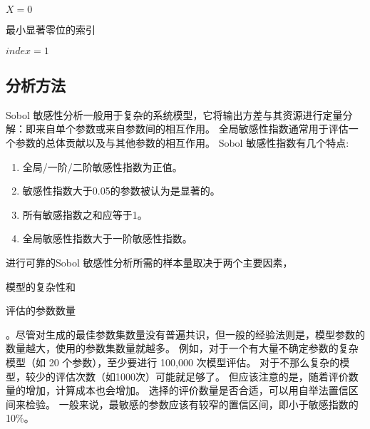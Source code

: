\begin{algorithm}
{{{                
            }
        }
        $X = 0$\\
    }
\end{algorithm}

\begin{algorithm}
    \caption{最小显著零位的索引}
    $index = 1$\\
\end{algorithm}


\subsection{分析方法}

Sobol 敏感性分析一般用于复杂的系统模型，它将输出方差与其资源进行定量分解：即来自单个参数或来自参数间的相互作用。%
全局敏感性指数通常用于评估一个参数的总体贡献以及与其他参数的相互作用。%
Sobol 敏感性指数有几个特点:
\begin{enumerate}
    \item 全局/一阶/二阶敏感性指数为正值。
    \item 敏感性指数大于0.05的参数被认为是显著的。
    \item 所有敏感指数之和应等于1。
    \item 全局敏感性指数大于一阶敏感性指数。
\end{enumerate}

进行可靠的Sobol 敏感性分析所需的样本量取决于两个主要因素，\begin{enumerate*}
    \item 模型的复杂性和
    \item 评估的参数数量
\end{enumerate*} 。尽管对生成的最佳参数集数量没有普遍共识，但一般的经验法则是，模型参数的数量越大，使用的参数集数量就越多。%
例如，对于一个有大量不确定参数的复杂模型（如 20 个参数），至少要进行 100,000 次模型评估。%
对于不那么复杂的模型，较少的评估次数（如1000次）可能就足够了。%
但应该注意的是，随着评价数量的增加，计算成本也会增加。%
选择的评价数量是否合适，可以用自举法置信区间来检验。%
一般来说，最敏感的参数应该有较窄的置信区间，即小于敏感指数的10\%。

